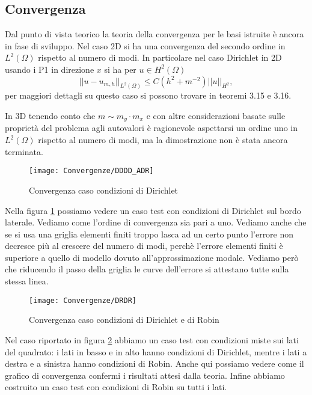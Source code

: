 \subsection*{Convergenza}
Dal punto di vista teorico la teoria della convergenza per le basi istruite \`e ancora in fase di sviluppo.
Nel caso 2D si ha una convergenza del secondo ordine in $L^2(\Omega)$ rispetto al numero di modi.
In particolare nel caso Dirichlet in 2D usando i P1 in direzione $x$ si ha per $u\in H^2(\Omega)$
\begin{equation}
 \label{eq:stimainl2}
 ||u-u_{m,h}||_{L^2(\Omega)}\leq C ( h^2+m^{-2}) ||u||_{H^2},
\end{equation}
per maggiori dettagli su questo caso si possono trovare in \cite{zilio:himod} teoremi 3.15 e 3.16.

In 3D tenendo conto che $m\sim m_y\cdot m_x$ e con altre considerazioni basate sulle propriet\`a del problema agli autovalori
\`e ragionevole aspettarsi un ordine uno in $L^2(\Omega)$ rispetto al numero di modi, ma la dimostrazione 
non \`e stata ancora terminata.

\begin{figure}[!h]
\centering
\texttt{[image: Convergenze/DDDD\_ADR]}
\caption{Convergenza caso condizioni di Dirichlet}
\label{fig:ddddconv}
\end{figure}

Nella figura \ref{fig:ddddconv} possiamo vedere un caso test con condizioni di Dirichlet sul bordo laterale. Vediamo 
come l'ordine di convergenza sia pari a uno. Vediamo anche che se si usa una griglia elementi finiti troppo 
lasca ad un certo punto l'errore non decresce pi\`u al crescere del numero di modi, perch\`e 
l'errore elementi finiti \`e superiore a quello di modello dovuto all'approssimazione modale.
Vediamo per\`o che riducendo il passo della griglia le curve dell'errore si attestano tutte sulla stessa linea.

\begin{figure}[!h]
\centering
\texttt{[image: Convergenze/DRDR]}
\caption{Convergenza caso condizioni di Dirichlet e di Robin}
\label{fig:drdrconv}
\end{figure}

Nel caso riportato in figura \ref{fig:drdrconv} abbiamo un caso test con condizioni miste sui lati del quadrato:
i lati in basso e in alto hanno condizioni di Dirichlet, mentre i lati a destra e a sinistra hanno condizioni di Robin.
Anche qui possiamo vedere come il grafico di convergenza confermi i risultati attesi dalla teoria.
Infine abbiamo costruito un caso test con condizioni di Robin su tutti i lati. 

